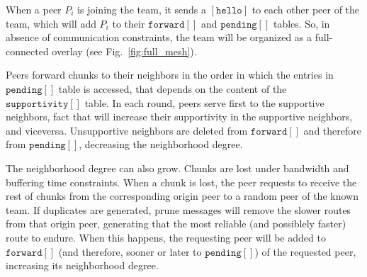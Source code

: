When a peer $P_i$ is joining the team, it sends a $[\mathtt{hello}]$
to each other peer of the team, which will add $P_i$ to their
$\mathtt{forward}[]$ and $\mathtt{pending}[]$ tables. So, in absence
of communication constraints, the team will be organized as a
full-connected overlay (see Fig.~\ref{fig:full_mesh}).

Peers forward chunks to their neighbors in the order in which the
entries in $\mathtt{pending}[]$ table is accessed, that depends on the
content of the $\mathtt{supportivity}[]$ table. In each round, peers
serve first to the supportive neighbors, fact that will increase their
supportivity in the supportive neighbors, and viceversa. Unsupportive
neighbors are deleted from $\mathtt{forward}[]$ and therefore from
$\mathtt{pending}[]$, decreasing the neighborhood degree.

The neighborhood degree can also grow. Chunks are lost under bandwidth
and buffering time constraints. When a chunk is lost, the peer
requests to receive the rest of chunks from the corresponding origin
peer to a random peer of the known team. If duplicates are generated,
prune messages will remove the slower routes from that origin peer,
generating that the most reliable (and possiblely faster) route to
endure. When this happens, the requesting peer will be added to
$\mathtt{forward}[]$ (and therefore, sooner or later to
$\mathtt{pending}[]$) of the requested peer, increasing its
neighborhood degree.
